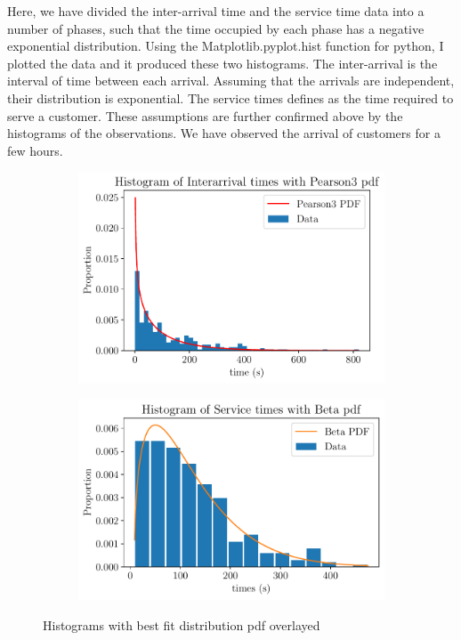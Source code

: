 \documentclass{article}
\begin{document}
Here, we have divided the inter-arrival time and the service time data into a number of phases, such that the time occupied by each phase has a negative exponential distribution.
Using the Matplotlib.pyplot.hist function for python, I plotted the data and it produced these two histograms​.
The inter-arrival is the interval of time between each arrival. Assuming that the arrivals are independent, their distribution is exponential.
The service times defines as the time required to serve a customer. 
These assumptions are further confirmed above by the histograms of the observations. We have observed the arrival of customers for a few hours.

\begin{figure}[H]
    \centering
    \begin{subfigure}[b]{0.45\textwidth}
        \centering
        \includegraphics[width=\textwidth]{fig3.pdf}
        \caption{}
        \label{fig:img3}
    \end{subfigure}
    \hfill
    \begin{subfigure}[b]{0.45\textwidth}
        \centering
        \includegraphics[width=\textwidth]{fig4.pdf}
        \caption{}
        \label{fig:img4}
    \end{subfigure}

    \caption{Histograms with best fit distribution pdf overlayed}
    \label{fig:two-figs2}
\end{figure}
\end{document}
